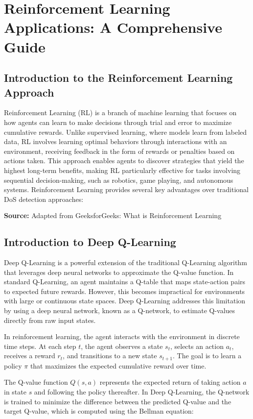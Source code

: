 \documentclass{report}
\begin{document}
\chapter{Reinforcement Learning Applications: A Comprehensive Guide}

\section{Introduction to the Reinforcement Learning Approach}

Reinforcement Learning (RL) is a branch of machine learning that focuses on how agents can learn to make decisions through trial and error to maximize cumulative rewards. Unlike supervised learning, where models learn from labeled data, RL involves learning optimal behaviors through interactions with an environment, receiving feedback in the form of rewards or penalties based on actions taken. This approach enables agents to discover strategies that yield the highest long-term benefits, making RL particularly effective for tasks involving sequential decision-making, such as robotics, game playing, and autonomous systems.
Reinforcement Learning provides several key advantages over traditional DoS detection approaches:

\noindent\textbf{Source:} Adapted from GeeksforGeeks: What is Reinforcement Learning
\section{Introduction to Deep Q-Learning}

Deep Q-Learning is a powerful extension of the traditional Q-Learning algorithm that leverages deep neural networks to approximate the Q-value function. In standard Q-Learning, an agent maintains a Q-table that maps state-action pairs to expected future rewards. However, this becomes impractical for environments with large or continuous state spaces. Deep Q-Learning addresses this limitation by using a deep neural network, known as a Q-network, to estimate Q-values directly from raw input states.

In reinforcement learning, the agent interacts with the environment in discrete time steps. At each step $t$, the agent observes a state $s_t$, selects an action $a_t$, receives a reward $r_t$, and transitions to a new state $s_{t+1}$. The goal is to learn a policy $\pi$ that maximizes the expected cumulative reward over time.

The Q-value function $Q(s, a)$ represents the expected return of taking action $a$ in state $s$ and following the policy thereafter. In Deep Q-Learning, the Q-network is trained to minimize the difference between the predicted Q-value and the target Q-value, which is computed using the Bellman equation:
\end{document}
